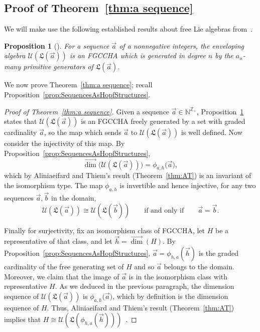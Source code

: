 \documentclass[11pt]{amsart}
\newtheorem{proposition}[theorem]{Proposition}
\theoremstyle{definition}
\numberwithin{equation}{section}
\def\NN{{\mathbb N}}
\def\ZZ{{\mathbb Z}}
\newcommand{\FGCCHA}{\textsf{FGCCHA}\xspace}
\newcommand{\vecdim}{\overrightarrow{\dim}}
\begin{document}
\subsection{Proof of Theorem~\ref{thm:a sequence}}
\label{sec:classificationproof}

We will make use the following established results
about free Lie algebras from~\cite{Reutenauer-FreeLieAlgebras}.

\begin{proposition}[{\cite[Theorem 0.5]{Reutenauer-FreeLieAlgebras}}]
\label{prop:LieToFree}
For a sequence $\vec{a}$ of a nonnegative integers, the enveloping algebra $\mathcal{U}(\mathfrak{L}(\vec{a}))$ is an \FGCCHA which is generated in degree $n$ by the $a_{n}$-many primitive generators of $\mathfrak{L}(\vec{a})$.
\end{proposition}

We now prove Theorem~\ref{thm:a sequence}; recall Proposition~\ref{prop:SequencesAsHopfStructures}.

\begin{proof}[Proof of Theorem~\ref{thm:a sequence}]
Given a sequence $\vec{a} \in \NN^{\ZZ_+}$, Proposition~\ref{prop:LieToFree} states that
$\mathcal{U}(\mathfrak{L}(\vec{a}))$ is an \FGCCHA freely generated by a set with graded
cardinality $\vec{a}$, so the map which sends $\vec{a}$ to $\mathcal{U}(\mathfrak{L}(\vec{a}))$ is well defined.
Now consider the injectivity of this map.
By Proposition~\ref{prop:SequencesAsHopfStructures},
\[
\vecdim\big(\mathcal{U}(\mathfrak{L}(\vec{a}))\big) = \phi_{a, h}\big(\vec{a}),
\]
which by Aliniaeifard and Thiem's result (Theorem~\ref{thm:AT}) is an invariant of the isomorphism type.
The map $\phi_{a, h}$ is invertible and hence injective,
for any two sequences $\vec{a}, \vec{b}$ in the domain,
\[
\mathcal{U}(\mathfrak{L}(\vec{a})) \cong \mathcal{U}(\mathfrak{L}(\vec{b}))
\qquad\text{if and only if}\qquad
\vec{a} = \vec{b}.
\]

Finally for surjectivity, fix an isomorphism class of \FGCCHA, let $H$ be a representative of that class, and let $\vec{h} = \vecdim(H)$.
By Proposition~\ref{prop:SequencesAsHopfStructures},
$\vec{a} = \phi_{h, a}(\vec{h})$ is the graded cardinality of the free generating set
of $H$ and so
$\vec{a}$ belongs to the domain.  
Moreover, we claim that the image of $\vec{a}$ is in the isomorphism class with representative $H$.  
As we deduced in the previous paragraph, the dimension sequence of
$\mathcal{U}(\mathfrak{L}(\vec{a}))$ is $\phi_{a, h}\big(\vec{a})$, which by definition is the dimension sequence of $H$.  
Thus, Aliniaeifard and Thiem's result (Theorem~\ref{thm:AT})
implies that $H \cong \mathcal{U}(\mathfrak{L}(\phi_{h, a}(\vec{h})))$~.
\end{proof}
\end{document}
